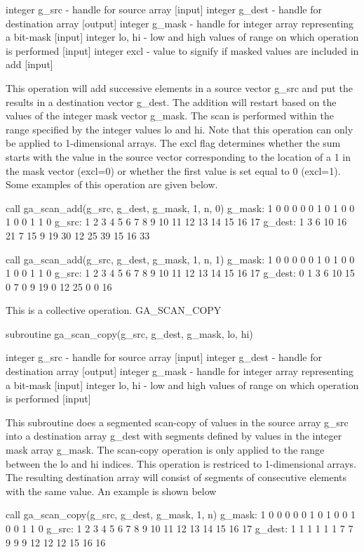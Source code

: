 integer g\_src - handle for source array {[}input{]} integer g\_dest
- handle for destination array {[}output{]} integer g\_mask - handle
for integer array representing a bit-mask {[}input{]} integer lo,
hi - low and high values of range on which operation is performed
{[}input{]} integer excl - value to signify if masked values are included
in add {[}input{]}

This operation will add successive elements in a source vector g\_src
and put the results in a destination vector g\_dest. The addition
will restart based on the values of the integer mask vector g\_mask.
The scan is performed within the range specified by the integer values
lo and hi. Note that this operation can only be applied to 1-dimensional
arrays. The excl flag determines whether the sum starts with the value
in the source vector corresponding to the location of a 1 in the mask
vector (excl=0) or whether the first value is set equal to 0 (excl=1).
Some examples of this operation are given below.

call ga\_scan\_add(g\_src, g\_dest, g\_mask, 1, n, 0) g\_mask: 1 0
0 0 0 0 1 0 1 0 0 1 0 0 1 1 0 g\_src: 1 2 3 4 5 6 7 8 9 10 11 12 13
14 15 16 17 g\_dest: 1 3 6 10 16 21 7 15 9 19 30 12 25 39 15 16 33

call ga\_scan\_add(g\_src, g\_dest, g\_mask, 1, n, 1) g\_mask: 1 0
0 0 0 0 1 0 1 0 0 1 0 0 1 1 0 g\_src: 1 2 3 4 5 6 7 8 9 10 11 12 13
14 15 16 17 g\_dest: 0 1 3 6 10 15 0 7 0 9 19 0 12 25 0 0 16

This is a collective operation. GA\_SCAN\_COPY

subroutine ga\_scan\_copy(g\_src, g\_dest, g\_mask, lo, hi)

integer g\_src - handle for source array {[}input{]} integer g\_dest
- handle for destination array {[}output{]} integer g\_mask - handle
for integer array representing a bit-mask {[}input{]} integer lo,
hi - low and high values of range on which operation is performed
{[}input{]}

This subroutine does a segmented scan-copy of values in the source
array g\_src into a destination array g\_dest with segments defined
by values in the integer mask array g\_mask. The scan-copy operation
is only applied to the range between the lo and hi indices. This operation
is restriced to 1-dimensional arrays. The resulting destination array
will consist of segments of consecutive elements with the same value.
An example is shown below

call ga\_scan\_copy(g\_src, g\_dest, g\_mask, 1, n) g\_mask: 1 0 0
0 0 0 1 0 1 0 0 1 0 0 1 1 0 g\_src: 1 2 3 4 5 6 7 8 9 10 11 12 13
14 15 16 17 g\_dest: 1 1 1 1 1 1 7 7 9 9 9 12 12 12 15 16 16

